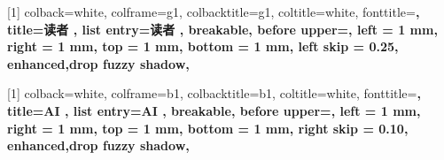 \pagestyle{main}
\geometry{
  a4paper,
  left=3cm,
  right=3cm,
  top=2.54cm,
  bottom=2.54cm,
  headheight=1.5cm,
  headsep=10pt
}


\hypersetup{
    CJKbookmarks=true,
    colorlinks=true,
    breaklinks=true,
}


\graphicspath{ {assets/figures/} }


\theoremstyle{plain}
\newtheorem{theorem}{Theorem}[section]
\newtheorem{proposition}[theorem]{Proposition}
\newtheorem{lemma}[theorem]{Lemma}
\newtheorem{corollary}[theorem]{Corollary}
\theoremstyle{definition}
\newtheorem{definition}[theorem]{Definition}
\newtheorem{assumption}[theorem]{Assumption}
\theoremstyle{remark}
\newtheorem{remark}[theorem]{Remark}




[1]{
        colback=white, 
        colframe=g1, %
        colbacktitle=g1, 
        coltitle=white, %
        fonttitle=\bfseries, 
        title={读者 \thetcbcounter}, 
        list entry={读者 \thetcbcounter\quad}, %
        breakable, %
        before upper={\parindent10pt\noindent},  %
        left = 1 mm, %
        right = 1 mm, %
        top = 1 mm, %
        bottom = 1 mm,%
        left skip = 0.25\textwidth,
        enhanced,drop fuzzy shadow,  %
}

[1]{
        colback=white, 
        colframe=b1, %
        colbacktitle=b1, 
        coltitle=white, %
        fonttitle=\bfseries, 
        title={AI \thetcbcounter}, 
        list entry={AI \thetcbcounter\quad}, %
        breakable, %
        before upper={\parindent10pt\noindent},  %
        left = 1 mm, %
        right = 1 mm, %
        top = 1 mm, %
        bottom = 1 mm,%
        right skip = 0.10\textwidth,
        enhanced,drop fuzzy shadow,  %
}

